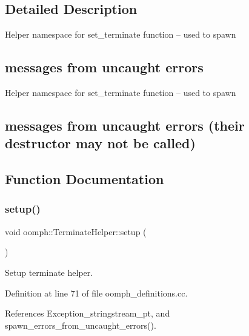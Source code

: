 \subsection{Detailed Description}
Helper namespace for set\+\_\+terminate function -- used to spawn \subsection*{messages from uncaught errors }

Helper namespace for set\+\_\+terminate function -- used to spawn \subsection*{messages from uncaught errors (their destructor may not be called) }

\subsection{Function Documentation}
\mbox{\label{namespaceoomph_1_1TerminateHelper_a38ec1b047a4438b6eba8a21b669c229d}} 
\subsubsection{\texorpdfstring{setup()}{setup()}}
{\footnotesize\ttfamily void oomph\+::\+Terminate\+Helper\+::setup (\begin{DoxyParamCaption}{ }\end{DoxyParamCaption})}



Setup terminate helper. 



Definition at line 71 of file oomph\+\_\+definitions.\+cc.



References Exception\+\_\+stringstream\+\_\+pt, and spawn\+\_\+errors\+\_\+from\+\_\+uncaught\+\_\+errors().




